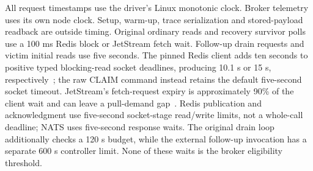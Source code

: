 All request timestamps use the driver's Linux monotonic clock. Broker telemetry uses its own node clock. Setup, warm-up, trace serialization and stored-payload readback are outside timing. Original ordinary reads and recovery survivor polls use a 100 ms Redis block or JetStream fetch wait. Follow-up drain requests and victim initial reads use five seconds. The pinned Redis client adds ten seconds to positive typed blocking-read socket deadlines, producing 10.1 s or 15 s, respectively~\cite{goredis970timeouts}; the raw CLAIM command instead retains the default five-second socket timeout. JetStream's fetch-request expiry is approximately 90\% of the client wait and can leave a pull-demand gap~\cite{natsgo1391}. Redis publication and acknowledgment use five-second socket-stage read/write limits, not a whole-call deadline; NATS uses five-second response waits. The original drain loop additionally checks a 120 s budget, while the external follow-up invocation has a separate 600 s controller limit. None of these waits is the broker eligibility threshold.

